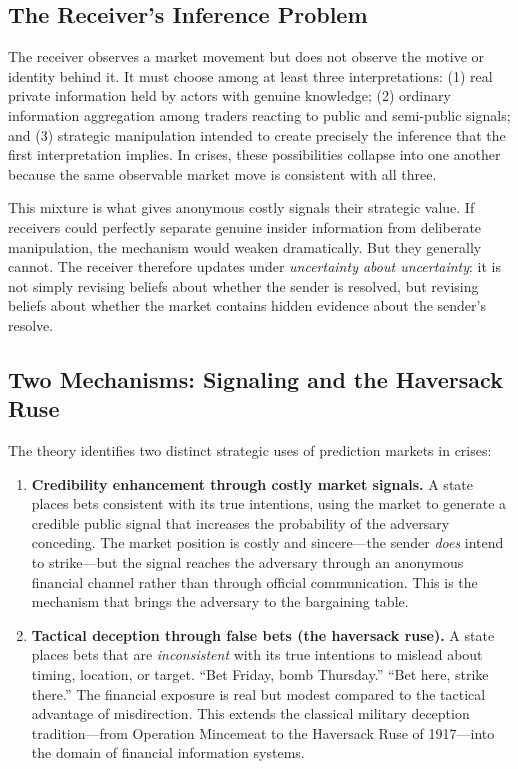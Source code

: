 \documentclass[12pt]{article}
\begin{document}
\subsection{The Receiver's Inference Problem}

The receiver observes a market movement but does not observe the motive or identity behind it. It must choose among at least three interpretations: (1) real private information held by actors with genuine knowledge; (2) ordinary information aggregation among traders reacting to public and semi-public signals; and (3) strategic manipulation intended to create precisely the inference that the first interpretation implies. In crises, these possibilities collapse into one another because the same observable market move is consistent with all three.

This mixture is what gives anonymous costly signals their strategic value. If receivers could perfectly separate genuine insider information from deliberate manipulation, the mechanism would weaken dramatically. But they generally cannot. The receiver therefore updates under \textit{uncertainty about uncertainty}: it is not simply revising beliefs about whether the sender is resolved, but revising beliefs about whether the market contains hidden evidence about the sender's resolve.

\subsection{Two Mechanisms: Signaling and the Haversack Ruse}

The theory identifies two distinct strategic uses of prediction markets in crises:

\begin{enumerate}[label=\textbf{\arabic*.}]
    \item \textbf{Credibility enhancement through costly market signals.} A state places bets consistent with its true intentions, using the market to generate a credible public signal that increases the probability of the adversary conceding. The market position is costly and sincere---the sender \textit{does} intend to strike---but the signal reaches the adversary through an anonymous financial channel rather than through official communication. This is the mechanism that brings the adversary to the bargaining table.

    \item \textbf{Tactical deception through false bets (the haversack ruse).} A state places bets that are \textit{inconsistent} with its true intentions to mislead about timing, location, or target. ``Bet Friday, bomb Thursday.'' ``Bet here, strike there.'' The financial exposure is real but modest compared to the tactical advantage of misdirection. This extends the classical military deception tradition---from Operation Mincemeat to the Haversack Ruse of 1917---into the domain of financial information systems.
\end{enumerate}
\end{document}
